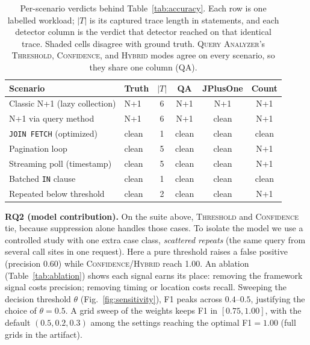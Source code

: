 \documentclass[sigplan,screen]{acmart}
\newcommand{\tool}{\textsc{Query Analyzer}}
\begin{document}
\begin{table}[t]
\centering
\caption{Per-scenario verdicts behind Table~\ref{tab:accuracy}. Each row is one
labelled workload; $|T|$ is its captured trace length in statements, and each
detector column is the verdict that detector reached on that identical trace.
\colorbox{gray!25}{Shaded} cells disagree with ground truth. \tool{}'s
\textsc{Threshold}, \textsc{Confidence}, and \textsc{Hybrid} modes agree on
every scenario, so they share one column (QA).}
\label{tab:perscenario}
\scriptsize
\setlength{\tabcolsep}{3.5pt}
\begin{tabular}{llcccc}
\toprule
Scenario & Truth & $|T|$ & QA & JPlusOne & Count \\
\midrule
Classic N+1 (lazy collection)  & N+1   & 6 & N+1   & N+1 & N+1 \\
N+1 via query method           & N+1   & 6 & N+1   & \cellcolor{gray!25}clean & N+1 \\
\texttt{JOIN FETCH} (optimized) & clean & 1 & clean & clean & clean \\
Pagination loop                & clean & 5 & clean & clean & \cellcolor{gray!25}N+1 \\
Streaming poll (timestamp)     & clean & 5 & clean & clean & \cellcolor{gray!25}N+1 \\
Batched \texttt{IN} clause      & clean & 1 & clean & clean & clean \\
Repeated below threshold       & clean & 2 & clean & clean & \cellcolor{gray!25}N+1 \\
\bottomrule
\end{tabular}
\vspace{-6pt}
\end{table}

\noindent\textbf{RQ2 (model contribution).} On the suite above, \textsc{Threshold}
and \textsc{Confidence} tie, because suppression alone handles those cases. To
isolate the model we use a controlled study with one extra case class,
\emph{scattered repeats} (the same query from several call sites in one request).
Here a pure threshold raises a false positive (precision 0.60) while
\textsc{Confidence}/\textsc{Hybrid} reach 1.00. An ablation
(Table~\ref{tab:ablation}) shows each signal earns its place: removing the
framework signal costs precision; removing timing or location costs recall.
Sweeping the decision threshold $\theta$ (Fig.~\ref{fig:sensitivity}), F1 peaks across $0.4$--$0.5$, justifying the choice of $\theta=0.5$. A grid sweep of the weights keeps F1 in $[0.75,1.00]$, with the default $(0.5,0.2,0.3)$ among the settings reaching the optimal F1${=}1.00$ (full grids in the artifact).
\end{document}
